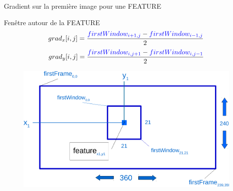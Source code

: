 \documentclass{bredelebeamer}
\begin{document}

\begin{frame}{Gradient sur la première image pour une FEATURE}

	\begin{block}{Fen\^etre autour de la FEATURE}
 $$grad_{x}[i,j] = \frac{\textcolor{blue}{firstWindow_{i+1,j}} - \textcolor{blue}{firstWindow_{i-1,j}}}{2}$$
 $$grad_{y}[i,j] = \frac{\textcolor{blue}{firstWindow_{i,j+1}} - \textcolor{blue}{firstWindow_{i,j-1}}}{2}$$
\end{block}

\begin{figure}
\includegraphics[scale=0.3]{images/firstFrameWindow.pdf}
\end{figure}

\end{frame}

\end{document}
